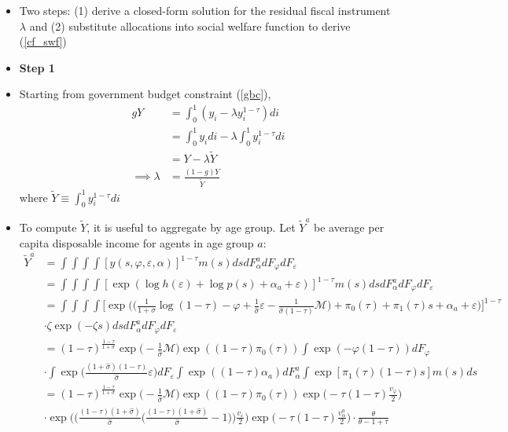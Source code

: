 \documentclass{article}
\newcommand{\M}{\mathcal{M}}
\begin{document}
\begin{itemize}
\item Two steps: (1) derive a closed-form solution for the residual fiscal instrument $\lambda$ and (2) substitute allocations into social welfare function to derive (\ref{cf_swf})
\item \textbf{Step 1}
\item Starting from government budget constraint (\ref{gbc}),
\begin{align*}
gY &= \int_0^1 (y_i - \lambda y_i^{1-\tau}) di\\
&= \int_0^1 y_i di - \lambda \int_0^1y_i^{1-\tau} di\\
&= Y - \lambda \tilde Y\\
\implies
\lambda &= \frac{(1-g) Y}{\tilde Y}
\end{align*}
where $\tilde Y \equiv \int_0^1 y_i^{1-\tau}di$
\item To compute $\tilde Y$, it is useful to aggregate by age group. Let $\tilde Y^a$ be average per capita disposable income for agents in age group $a$:
\begin{align*}
\tilde Y^a
&= \int \int \int \int [y(s, \varphi, \varepsilon, \alpha)]^{1-\tau} m(s) ds dF_\alpha^a dF_\varphi dF_\varepsilon\\
&= \int \int \int \int [ \exp(\log h(\varepsilon)+ \log p(s) + \alpha_a + \varepsilon)]^{1-\tau} m(s) ds dF_\alpha^a dF_\varphi dF_\varepsilon\\
&= \int \int \int \int \Bigg[ \exp\Bigg(\Big(\frac{1}{1 + \sigma} \log ( 1 - \tau) - \varphi + \frac{1}{\hat{\sigma}} \varepsilon - \frac{1}{\hat \sigma (1- \tau)} \M \Big)+  \pi_0(\tau) + \pi_1(\tau)  s + \alpha_a + \varepsilon\Bigg)\Bigg]^{1-\tau} \\ 
&\cdot\zeta \exp (-\zeta s ) ds dF_\alpha^a dF_\varphi dF_\varepsilon\\
&= (1-\tau)^{\frac{1-\tau}{1+\sigma}} \exp\Big(-\frac{1}{\hat\sigma} \M\Big)\exp((1-\tau)\pi_0(\tau))
\int \exp(-\varphi(1-\tau)) dF_\varphi  \\
& \cdot\int \exp\Big(\frac{(1+\hat\sigma)(1-\tau)}{\hat \sigma} \varepsilon\Big) dF_\varepsilon  \int \exp((1-\tau)\alpha_a) dF_\alpha^a \int \exp[  \pi_1(\tau)  (1-\tau)s ] m(s)ds  \\
&= (1-\tau)^{\frac{1-\tau}{1+\sigma}} \exp\Big(-\frac{1}{\hat\sigma} \M\Big)\exp((1-\tau)\pi_0(\tau))
\exp\Big(-\tau(1-\tau)\frac{v_\varphi}{2}\Big) \\
& \cdot \exp\Big( \Big( \frac{(1-\tau)(1+\hat\sigma)}{\hat \sigma}\Big(\frac{(1-\tau)(1+\hat\sigma)}{\hat \sigma} - 1 \Big)\Big) \frac{v_\varepsilon}{2} \Big)  \exp\Big( -\tau(1-\tau) \frac{v_{\alpha}^a}{2} \Big) \cdot \frac{\theta}{\theta - 1 + \tau} 

\end{align*}
\end{itemize}
\end{document}
